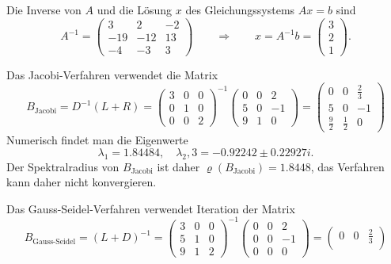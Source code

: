 \begin{loesung}

\begin{teilaufgaben}
\item
Die Inverse von $A$ und die Lösung $x$ des Gleichungssystems $Ax=b$ sind
\[
A^{-1}
=
\begin{pmatrix}
   3&   2&  -2\\
 -19& -12&  13\\
  -4&  -3&   3
\end{pmatrix}
\qquad\Rightarrow\qquad
x=A^{-1}b=
\begin{pmatrix}
3\\2\\1
\end{pmatrix}.
\]
\item
Das Jacobi-Verfahren verwendet die Matrix
\[
B_{\text{Jacobi}}
=
D^{-1}(L+R)
=
\begin{pmatrix}
 3&  0&  0 \\
 0&  1&  0 \\
 0&  0&  2
\end{pmatrix}^{-1}
\begin{pmatrix}
 0&  0&  2 \\
 5&  0& -1 \\
 9&  1&  0
\end{pmatrix}
=
\begin{pmatrix}
   0    &   0    &\frac23\\
   5    &   0    & -1    \\
\frac92 &\frac12 &  0 
\end{pmatrix}
\]
Numerisch findet man die Eigenwerte
\[
\lambda_1 =    1.84484,
\quad
\lambda_2,3 =
  -0.92242 \pm 0.22927i.
\]
Der Spektralradius von $B_{\text{Jacobi}}$ ist daher
$\varrho(B_{\text{Jacobi}}) = 1.8448$, das Verfahren kann daher nicht
konvergieren.
\item
Das Gauss-Seidel-Verfahren verwendet Iteration der Matrix
\[
B_{\text{Gauss-Seidel}}
=
(L+D)^{-1}
=
\begin{pmatrix}
   3&  0&  0 \\
   5&  1&  0 \\
   9&  1&  2
\end{pmatrix}^{-1}
\begin{pmatrix}
   0&  0&  2 \\
   0&  0& -1 \\
   0&  0&  0
\end{pmatrix}
=
\begin{pmatrix}
0&0&\frac23\\

\end{pmatrix}\]
\end{teilaufgaben}
\end{loesung}
